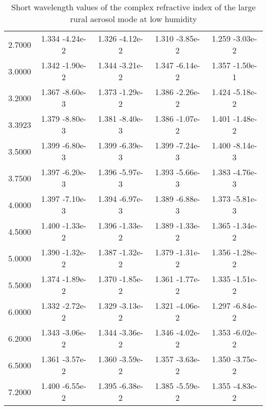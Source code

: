 \documentclass[12pt]{article}
\begin{document}
\begin{center}
\begin{table}
\begin{tabular}{| c | c | c | c | c |  }
2.7000 &  1.334 -4.24e-2 &  1.326   -4.12e-2 &   1.310   -3.85e-2 &    1.259   -3.03e-2     \\
3.0000 &  1.342 -1.90e-2 &  1.344   -3.21e-2 &   1.347   -6.14e-2 &    1.357   -1.50e-1    \\
3.2000 &  1.367 -8.60e-3 &  1.373   -1.29e-2 &   1.386   -2.26e-2 &    1.424   -5.18e-2    \\
3.3923 &  1.379 -8.80e-3 &  1.381   -8.40e-3 &   1.386   -1.07e-2 &    1.401   -1.48e-2    \\
3.5000 &  1.399 -6.80e-3 &  1.399   -6.39e-3 &   1.399   -7.24e-3 &    1.400   -8.14e-3   \\
3.7500 &  1.397 -6.20e-3 &  1.396   -5.97e-3 &   1.393   -5.66e-3 &    1.383   -4.76e-3    \\
4.0000 &  1.397 -7.10e-3 &  1.394   -6.97e-3 &   1.389   -6.88e-3 &    1.373   -5.81e-3    \\
4.5000 &  1.400 -1.33e-2 &  1.396   -1.33e-2 &   1.389   -1.33e-2 &    1.365   -1.34e-2    \\
5.0000 &  1.390 -1.32e-2 &  1.387   -1.32e-2 &   1.379   -1.31e-2 &    1.356   -1.28e-2   \\
5.5000 &  1.374 -1.89e-2 &  1.370   -1.85e-2 &   1.361   -1.77e-2 &    1.335   -1.51e-2    \\
6.0000 &  1.332 -2.72e-2  & 1.329   -3.13e-2 &   1.321   -4.06e-2 &    1.297   -6.84e-2   \\
6.2000 &  1.343 -3.06e-2 &  1.344   -3.36e-2 &   1.346   -4.02e-2  &   1.353   -6.02e-2    \\
6.5000 &  1.361 -3.57e-2 &  1.360   -3.59e-2 &   1.357   -3.63e-2 &    1.350   -3.75e-2     \\
7.2000&   1.400 -6.55e-2 &  1.395   -6.38e-2 &   1.385   -5.59e-2  &   1.355   -4.83e-2   \\
\hline
\end{tabular}
\caption{Short wavelength values of the complex refractive index of the large rural aerosol mode at low humidity}
\end{table}
\end{center}
\end{document}
